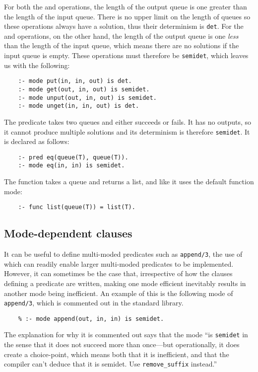 For both the  and  operations,
the length of the output queue is one greater than
the length of the input queue.
There is no upper limit on the length of queues
so these operations always have a solution,
thus their determinism is \texttt{det}.
For the  and  operations,
on the other hand,
the length of the output queue is one \emph{less} than
the length of the input queue,
which means there are no solutions if the input queue is empty.
These operations must therefore be \texttt{semidet},
which leaves us with the following:
\begin{verbatim}
    :- mode put(in, in, out) is det.
    :- mode get(out, in, out) is semidet.
    :- mode unput(out, in, out) is semidet.
    :- mode unget(in, in, out) is det.
\end{verbatim}

The  predicate takes two queues and either succeeds or fails.
It has no outputs,
so it cannot produce multiple solutions
and its determinism is therefore \texttt{semidet}.
It is declared as follows:
\begin{verbatim}
    :- pred eq(queue(T), queue(T)).
    :- mode eq(in, in) is semidet.
\end{verbatim}

The  function takes a queue and returns a list,
and like  it uses the default function mode:
\begin{verbatim}
    :- func list(queue(T)) = list(T).
\end{verbatim}


\subsection{Mode-dependent clauses}
\label{sec:mode-dependent}

It can be useful to define
multi-moded predicates such as \texttt{append/3},
the use of which can readily enable
larger multi-moded predicates to be implemented.
However,
it can sometimes be the case that,
irrespective of how the clauses defining a predicate are written,
making one mode efficient inevitably results in
another mode being inefficient.
An example of this is the following mode of \texttt{append/3},
which is commented out in the standard library.
\begin{verbatim}
    % :- mode append(out, in, in) is semidet.
\end{verbatim}
The explanation for why it is commented out says that the mode
``is \texttt{semidet} in the sense that it does not
succeed more than once---but operationally, it does create a choice-point,
which means both that it is inefficient,
and that the compiler can't deduce that it is semidet.
Use \texttt{remove\_suffix} instead.''

